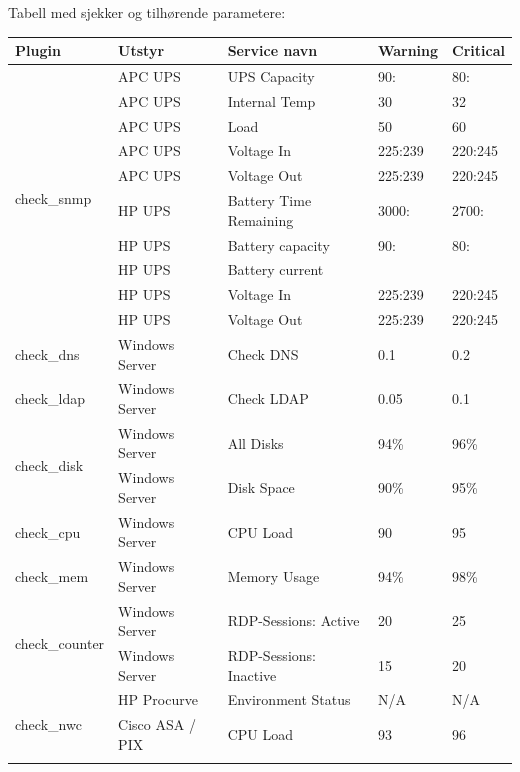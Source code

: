 	Tabell med sjekker og tilhørende parametere:
	\begin{table}
	\begin{center}
		\begin{tabular}{| p{3cm} | l | l | l | l |}
	 \hline
		\textbf{Plugin} & \textbf{Utstyr} & \textbf{Service navn} & \textbf{Warning} & \textbf{Critical}
		\\ \hline
		\multirow{10}{*}{check\_snmp}   & APC UPS 		& UPS Capacity			& 90:	& 80: \\ \cline{2-5}
		& APC UPS			& Internal Temp			& 30	& 32 \\ \cline{2-5}
		& APC UPS			& Load				& 50	& 60 \\ \cline{2-5}
		& APC UPS			& Voltage In			& 225:239 & 220:245 \\ \cline{2-5}
		& APC UPS			& Voltage Out			& 225:239 & 220:245 \\ \cline{2-5}
		& HP UPS			& Battery Time Remaining 	& 3000: & 2700: \\ \cline{2-5}
		& HP UPS			& Battery capacity		& 90: 	& 80: \\ \cline{2-5}
		& HP UPS			& Battery current		& 	& \\ \cline{2-5}
		& HP UPS			& Voltage In			& 225:239 & 220:245 \\ \cline{2-5} 
		& HP UPS			& Voltage Out			& 225:239 & 220:245 \\ \hline
		check\_dns  & Windows Server	& Check DNS			& 0.1	& 0.2 \\ \hline
		check\_ldap & Windows Server    & Check LDAP			& 0.05	& 0.1 \\ \hline 
		\multirow{2}{*}{check\_disk}    & Windows Server		& All Disks			& 94\%	& 96\% \\ \cline{2-5}
						& Windows Server		& Disk Space			& 90\%	& 95\% \\ \hline
		check\_cpu		        & Windows Server		& CPU Load			& 90	& 95  \\ \hline
		check\_mem		        & Windows Server		& Memory Usage			& 94\%	& 98\% \\ \hline
		\multirow{2}{*}{check\_counter} & Windows Server 		& RDP-Sessions: Active		& 20	& 25 \\ \cline{2-5}
						& Windows Server		& RDP-Sessions: Inactive	& 15	& 20 \\ \hline
		\multirow{4}{*}{check\_nwc} 	& HP Procurve                   & Environment Status            & N/A   & N/A \\ \cline{2-5}
						& Cisco ASA / PIX		& CPU Load			& 93	& 96 \\ \cline{2-5}

\end{tabular}
\end{center}
\end{table}
